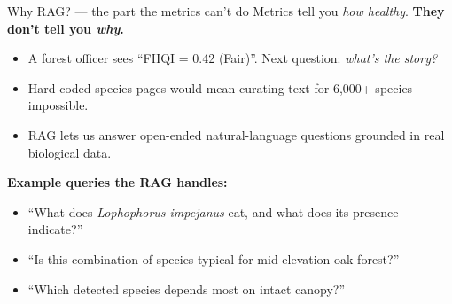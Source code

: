 \documentclass[aspectratio=169]{beamer}
\begin{document}
\begin{frame}{Why RAG? --- the part the metrics can't do}
  Metrics tell you \emph{how healthy}. \textbf{They don't tell you \emph{why}.}
  \vspace{0.4em}
  \begin{itemize}
    \item A forest officer sees ``FHQI = 0.42 (Fair)''. Next question: \emph{what's the story?}
    \item Hard-coded species pages would mean curating text for 6{,}000+ species --- impossible.
    \item RAG lets us answer \alert{open-ended natural-language questions} grounded in real biological data.
  \end{itemize}
  \vspace{0.4em}
  \textbf{Example queries the RAG handles:}
  \begin{itemize}
    \item ``What does \emph{Lophophorus impejanus} eat, and what does its presence indicate?''
    \item ``Is this combination of species typical for mid-elevation oak forest?''
    \item ``Which detected species depends most on intact canopy?''
  \end{itemize}
\end{frame}
\end{document}
